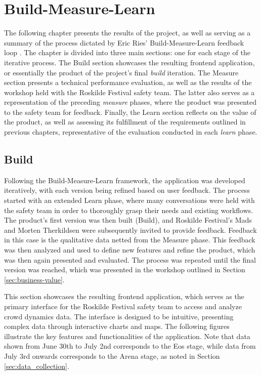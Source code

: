 \chapter{Build-Measure-Learn}
\label{chap:results}

The following chapter presents the results of the project, as well as serving as a summary of the process dictated by Eric Ries' Build-Measure-Learn feedback loop \cite{lean_startup}. The chapter is divided into three main sections: one for each stage of the iterative process. The Build section showcases the resulting frontend application, or essentially the product of the project's final \textit{build} iteration. The Measure section presents a technical performance evaluation, as well as the results of the workshop held with the Roskilde Festival safety team. The latter also serves as a representation of the preceding \textit{measure} phases, where the product was presented to the safety team for feedback. Finally, the Learn section reflects on the value of the product, as well as assessing its fulfillment of the requirements outlined in previous chapters, representative of the evaluation conducted in each \textit{learn} phase.

\section{Build}
\label{sec:frontend-showcase}

Following the Build-Measure-Learn framework, the application was developed iteratively, with each version being refined based on user feedback. The process started with an extended Learn phase, where many conversations were held with the safety team in order to thoroughly grasp their needs and existing workflows. The product's first version was then built (Build), and Roskilde Festival's Mads and Morten Therkildsen were subsequently invited to provide feedback. Feedback in this case is the qualitative data netted from the Measure phase. This feedback was then analyzed and used to define new features and refine the product, which was then again presented and evaluated. The process was repeated until the final version was reached, which was presented in the workshop outlined in Section \ref{sec:business-value}.

This section showcases the resulting frontend application, which serves as the primary interface for the Roskilde Festival safety team to access and analyze crowd dynamics data. The interface is designed to be intuitive, presenting complex data through interactive charts and maps. The following figures illustrate the key features and functionalities of the application. Note that data shown from June 30th to July 2nd corresponds to the Eos stage, while data from July 3rd onwards corresponds to the Arena stage, as noted in Section \ref{sec:data_collection}.


